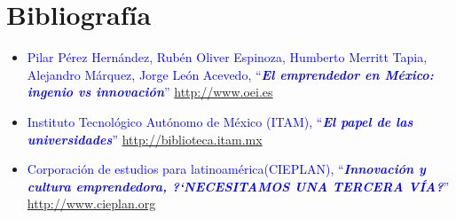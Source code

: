 \documentclass[11pt,letterpaper,titlepage]{article}
\begin{document}
\section{Bibliograf\'ia}
\begin{itemize}



 \item \textcolor{blue}{Pilar P\'erez Hern\'andez, Rub\'en Oliver Espinoza, Humberto Merritt Tapia, Alejandro M\'arquez, Jorge Le\'on Acevedo, ``\textbf{\textit{El emprendedor en M\'exico: ingenio vs innovaci\'on}}'' \href{http://www.oei.es/memoriasctsi/mesa12/m12p25.pdf}{http://www.oei.es} }



\item \textcolor{blue}{Instituto Tecnol\'ogico Aut\'onomo de M\'exico (ITAM), ``\textbf{\textit{El papel de las universidades}}'' \href{http://biblioteca.itam.mx/estudios/estudio/letras39-40/texto10/sec\_2.html}{http://biblioteca.itam.mx} }


\item \textcolor{blue}{Corporaci\'on de estudios para latinoam\'erica(CIEPLAN), ``\textbf{\textit{Innovaci\'on y cultura emprendedora, ?`NECESITAMOS UNA TERCERA V\'IA?}}'' \href{http://www.cieplan.org/archivos/Capitulo\%20046.PDF}{http://www.cieplan.org} }



\end{itemize}
\end{document}
